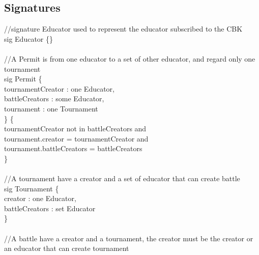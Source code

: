 \documentclass{article}
\begin{document}
{\subsection{Signatures}
\color{gray}
//signature Educator used to represent the educator subscribed to the CBK  \\
\color{blue}
sig
\color{black}
Educator  \{\} \\
\\
\color{gray}
//A Permit is from one educator to a set of other educator, and regard only one tournament\\
\color{blue}
sig
\color{black}
Permit \{\\
\-\hspace{1cm}    tournamentCreator : \color{blue} one \color{black} Educator,\\
\-\hspace{1cm}    battleCreators : \color{blue} some \color{black} Educator,\\
\-\hspace{1cm}    tournament : \color{blue} one \color{black} Tournament\\
\}	\{\\
\-\hspace{1cm}    tournamentCreator \color{blue} not in \color{black} battleCreators \color{blue} and \color{black}\\
\-\hspace{1cm}    tournament.creator \color{blue} = \color{black} tournamentCreator \color{blue} and \color{black}\\
\-\hspace{1cm}    tournament.battleCreators \color{blue} = \color{black} battleCreators\\
\}\\
\\
\color{gray}
//A tournament have a creator and a set of educator that can create battle\\
\color{blue}
sig
\color{black}
Tournament \{ \\
\-\hspace{1cm}    creator : \color{blue} one \color{black} Educator,\\
\-\hspace{1cm}    battleCreators : \color{blue} set \color{black} Educator\\
\}\\
\color{gray}
\\
//A battle have a creator and a tournament, the creator must be the creator or an educator that can create tournament\\
}
\end{document}
